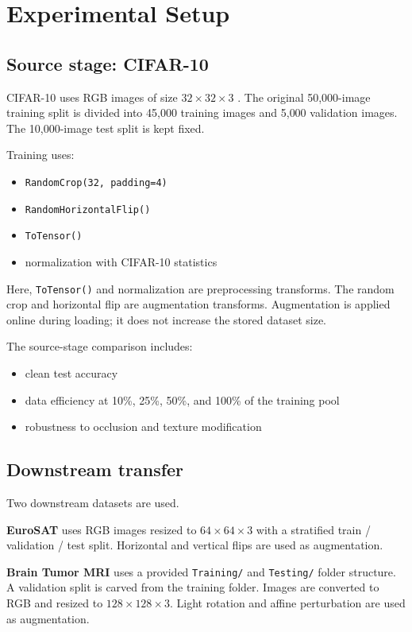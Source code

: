 \documentclass[11pt]{article}
\begin{document}
\section{Experimental Setup}
\subsection{Source stage: CIFAR-10}
CIFAR-10 uses RGB images of size $32 \times 32 \times 3$ \cite{krizhevsky2009learning}. The original 50{,}000-image training split is divided into 45{,}000 training images and 5{,}000 validation images. The 10{,}000-image test split is kept fixed.

Training uses:
\begin{itemize}
    \item \texttt{RandomCrop(32, padding=4)}
    \item \texttt{RandomHorizontalFlip()}
    \item \texttt{ToTensor()}
    \item normalization with CIFAR-10 statistics
\end{itemize}

Here, \texttt{ToTensor()} and normalization are preprocessing transforms. The random crop and horizontal flip are augmentation transforms. Augmentation is applied online during loading; it does not increase the stored dataset size.

The source-stage comparison includes:
\begin{itemize}
    \item clean test accuracy
    \item data efficiency at 10\%, 25\%, 50\%, and 100\% of the training pool
    \item robustness to occlusion and texture modification
\end{itemize}

\subsection{Downstream transfer}
Two downstream datasets are used.

\textbf{EuroSAT} uses RGB images resized to $64 \times 64 \times 3$ with a stratified train / validation / test split. Horizontal and vertical flips are used as augmentation.

\textbf{Brain Tumor MRI} uses a provided \texttt{Training/} and \texttt{Testing/} folder structure. A validation split is carved from the training folder. Images are converted to RGB and resized to $128 \times 128 \times 3$. Light rotation and affine perturbation are used as augmentation.
\end{document}
